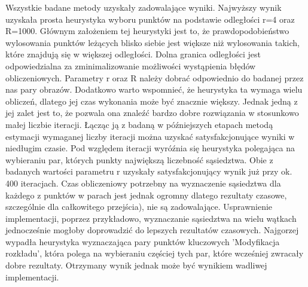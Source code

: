 \documentclass[../main.tex]{subfiles}
\begin{document}
    Wszystkie badane metody uzyskały zadowalające wyniki. Najwyższy wynik uzyskała prosta heurystyka wyboru punktów na podstawie odległości r=4 oraz R=1000. Głównym założeniem tej heurystyki jest to, że prawdopodobieństwo wylosowania punktów leżących blisko siebie jest większe niż wylosowania takich, które znajdują się w większej odległości. Dolna granica odległości jest odpowiedzialna za zminimalizowanie możliwości wystąpienia błędów obliczeniowych. Parametry r oraz R należy dobrać odpowiednio do badanej przez nas pary obrazów. Dodatkowo warto wspomnieć, że heurystyka ta wymaga wielu obliczeń, dlatego jej czas wykonania może być znacznie większy. Jednak jedną z jej zalet jest to, że pozwala ona znaleźć bardzo dobre rozwiązania w stosunkowo małej liczbie iteracji. Łącząc ją z badaną w późniejszych etapach metodą estymacji wymaganej liczby iteracji można uzyskać satysfakcjonujące wyniki w niedługim czasie. Pod względem iteracji wyróźnia się heurystyka polegająca na wybieraniu par, których punkty największą liczebność sąsiedztwa. Obie z badanych wartości parametru r uzyskały satysfakcjonujący wynik już przy ok. 400 iteracjach. Czas obliczeniowy potrzebny na wyznaczenie sąsiedztwa dla każdego z punktów w parach jest jednak ogromny dlatego rezultaty czasowe, szczególnie dla całkowitego przejścia), nie są zadowalające. Usprawnienie implementacji, poprzez przykładowo, wyznaczanie sąsiedztwa na wielu wątkach jednocześnie mogłoby doprowadzić do lepszych rezultatów czasowych. Najgorzej wypadła heurystyka wyznaczająca pary punktów kluczowych 'Modyfikacja rozkładu', która polega na wybieraniu częściej tych par, które wcześniej zwracały dobre rezultaty. Otrzymany wynik jednak może być wynikiem wadliwej implementacji.
    
\end{document}
